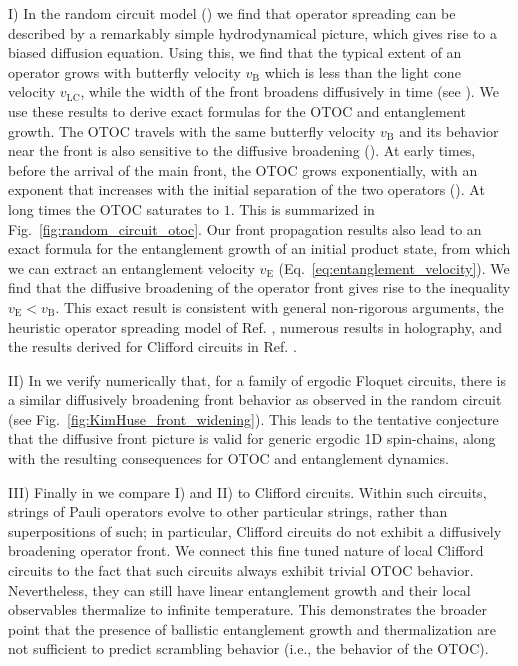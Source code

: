 \documentclass[aps,prb,twocolumn,superscriptaddress]{revtex4-1}
\begin{document}
I) In the random circuit model () we find that operator spreading can be described by a remarkably simple hydrodynamical picture, which gives rise to a biased diffusion equation. Using this, we find that the typical extent of an operator grows with butterfly velocity $v_{\text{B}}$ which is less than the light cone velocity $v_{\text{LC}}$, while the width of the front broadens diffusively in time (see ). We use these results to derive exact formulas for the OTOC and entanglement growth. The OTOC travels with the same butterfly velocity $v_{\text{B}}$ and its behavior near the front is also sensitive to the diffusive broadening (). At early times, before the arrival of the main front, the OTOC grows exponentially, with an exponent that increases with the initial separation of the two operators (). At long times the OTOC saturates to $1$. This is summarized in Fig.~\ref{fig:random_circuit_otoc}. Our front propagation results also lead to an exact formula for the entanglement growth of an initial product state, from which we can extract an entanglement velocity $v_\text{E}$ (Eq.~\eqref{eq:entanglement_velocity}). We find that the diffusive broadening of the operator front gives rise to the inequality $v_\text{E}<v_{\text{B}}$. This exact result is consistent with general non-rigorous arguments\cite{Jeddi15,Mezei16}, the heuristic operator spreading model of Ref. , numerous results in holography\cite{Hartman2013,Liu14a,Liu14b}, and the results derived for Clifford circuits in Ref. . 

II) In  we verify numerically that, for a family of ergodic Floquet circuits, there is a similar diffusively broadening front behavior as observed in the random circuit (see Fig.~\ref{fig:KimHuse_front_widening}). This leads to the tentative conjecture that the diffusive front picture is valid for generic ergodic 1D spin-chains, along with the resulting consequences for OTOC and entanglement dynamics.

III) Finally in  we compare I) and II) to Clifford circuits. Within such circuits, strings of Pauli operators evolve to other particular strings, rather than superpositions of such; in particular, Clifford circuits do not exhibit a diffusively broadening operator front. We connect this fine tuned nature of local Clifford circuits to the fact that such circuits always exhibit trivial OTOC behavior. Nevertheless, they can still have linear entanglement growth and their local  observables thermalize to infinite temperature. This demonstrates the broader point that the presence of ballistic entanglement growth and thermalization are not sufficient to predict scrambling behavior (i.e., the behavior of the OTOC).
\end{document}
